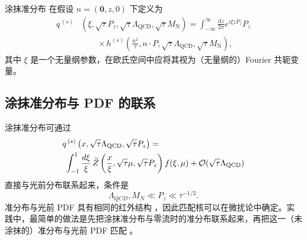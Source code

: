 涂抹准分布 \cite{Monahan:2016bvm} 在假设 $n = (\mathbf{0},z,0)$ 下定义为
\begin{align}\label{eq:qpdfdef}
q^{\,(s)}{} & \left(\xi,\sqrt{\tau}P_z,\sqrt{\tau}\Lambda_{\mathrm{QCD}},
\sqrt{\tau}M_\mathrm{N}\right)
=
\int_{-\infty}^\infty \frac{\mathrm{d}z}{2\pi} e^{i\xi z
P_z} P_z\nonumber \\
{} & \qquad \times h^{(s)}\left(\frac{n^2}{\tau},n\cdot P,\sqrt{\tau}\Lambda_{\mathrm{QCD}},
\sqrt{\tau}M_\mathrm{N}\right),
\end{align}
其中 $\xi$ 是一个无量纲参数，在欧氏空间中应将其视为（无量纲的）Fourier 共轭变量。

\subsection{涂抹准分布与 PDF 的联系}

涂抹准分布可通过 \cite{Monahan:2016bvm}
\begin{align}
{} & q^{\,(s)}\left(x,\sqrt{\tau} \Lambda_{\mathrm{QCD}}, \sqrt{\tau}P_z\right) =  \nonumber \\
{} & \; \int_{-1}^{1}
\frac{d\xi}{\xi}\, \widetilde{Z}\left(\frac{x}{\xi},\sqrt{\tau}\mu,
\sqrt{\tau}P_z\right)
f(\xi,\mu) +
{\cal O}(\sqrt{\tau}\Lambda_{\mathrm{QCD}})
\end{align}
直接与光前分布联系起来，条件是
\begin{equation}\label{eq:scales_tau}
\Lambda_{QCD},M_N\ll P_z \ll \tau^{-1/2}.
\end{equation}
准分布与光前 PDF 具有相同的红外结构 \cite{Ma:2014jla,Ma:2014jga,Carlson:2017gpk,Briceno:2017cpo}，因此匹配核可以在微扰论中确定。实践中，最简单的做法是先把涂抹准分布与零流时的准分布联系起来，再把这一（未涂抹的）准分布与光前 PDF 匹配 \cite{Xiong:2013bka,Ji:2015jwa}。

